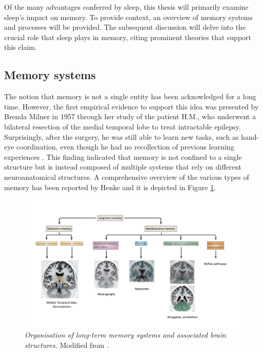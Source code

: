 Of the many advantages conferred by sleep, this thesis will primarily examine sleep’s impact on memory. To provide context, an overview of memory systems and processes will be provided. The subsequent discussion will delve into the crucial role that sleep plays in memory, citing prominent theories that support this claim.

\subsection{Memory systems}
The notion that memory is not a single entity has been acknowledged for a long time. However, the first empirical evidence to support this idea was presented by Brenda Milner in 1957 through her study of the patient H.M., who underwent a bilateral resection of the medial temporal lobe to treat intractable epilepsy. Surprisingly, after the surgery, he was still able to learn new tasks, such as hand-eye coordination, even though he had no recollection of previous learning experiences \parencite{squire_conscious_2015}. This finding indicated that memory is not confined to a single structure but is instead composed of multiple systems that rely on different neuroanatomical structures. A comprehensive overview of the various types of memory has been reported by Henke \parencite{henke_model_2010} and it is depicted in Figure \ref{fig:LTM}. 

\FloatBarrier
\begin{figure}
    \centering    \includegraphics[width=0.9\linewidth]{1_Introduction//IntroImages/LTM.jpg}
    \caption[\textit{Organisation of long-term memory systems and associated brain structures}]{\textit{Organisation of long-term memory systems and associated brain structures.} Modified from \cite{henke_model_2010}. \vspace{1cm}}
    \label{fig:LTM}
\end{figure}

